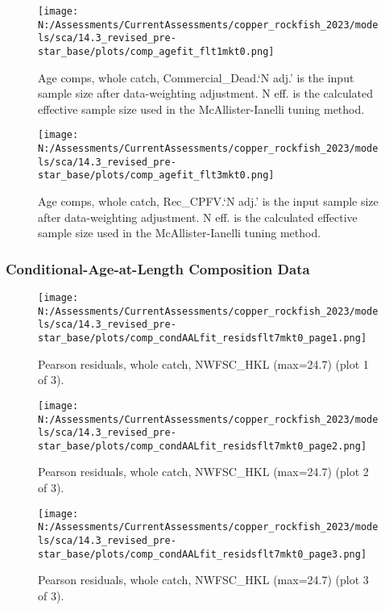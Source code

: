 \documentclass[11pt,
  english,
  letterpaper,
]{article}
\begin{document}
\begin{figure}
\centering
\texttt{[image: N:/Assessments/CurrentAssessments/copper\_rockfish\_2023/models/sca/14.3\_revised\_pre-star\_base/plots/comp\_agefit\_flt1mkt0.png]}
\caption{Age comps, whole catch, Commercial\_Dead.`N adj.' is the input sample size after data-weighting adjustment. N eff. is the calculated effective sample size used in the McAllister-Ianelli tuning method.\label{fig:comp_agefit_flt1mkt0}}
\end{figure}

\begin{figure}
\centering
\texttt{[image: N:/Assessments/CurrentAssessments/copper\_rockfish\_2023/models/sca/14.3\_revised\_pre-star\_base/plots/comp\_agefit\_flt3mkt0.png]}
\caption{Age comps, whole catch, Rec\_CPFV.`N adj.' is the input sample size after data-weighting adjustment. N eff. is the calculated effective sample size used in the McAllister-Ianelli tuning method.\label{fig:comp_agefit_flt3mkt0}}
\end{figure}

\newpage

\hypertarget{caal-data}{%
\subsubsection{Conditional-Age-at-Length Composition Data}\label{caal-data}}

\begin{figure}
\centering
\texttt{[image: N:/Assessments/CurrentAssessments/copper\_rockfish\_2023/models/sca/14.3\_revised\_pre-star\_base/plots/comp\_condAALfit\_residsflt7mkt0\_page1.png]}
\caption{Pearson residuals, whole catch, NWFSC\_HKL (max=24.7) (plot 1 of 3).\label{fig:comp_condAALfit_residsflt7mkt0_page1}}
\end{figure}

\begin{figure}
\centering
\texttt{[image: N:/Assessments/CurrentAssessments/copper\_rockfish\_2023/models/sca/14.3\_revised\_pre-star\_base/plots/comp\_condAALfit\_residsflt7mkt0\_page2.png]}
\caption{Pearson residuals, whole catch, NWFSC\_HKL (max=24.7) (plot 2 of 3).\label{fig:comp_condAALfit_residsflt7mkt0_page2}}
\end{figure}

\begin{figure}
\centering
\texttt{[image: N:/Assessments/CurrentAssessments/copper\_rockfish\_2023/models/sca/14.3\_revised\_pre-star\_base/plots/comp\_condAALfit\_residsflt7mkt0\_page3.png]}
\caption{Pearson residuals, whole catch, NWFSC\_HKL (max=24.7) (plot 3 of 3).\label{fig:comp_condAALfit_residsflt7mkt0_page3}}
\end{figure}
\end{document}
